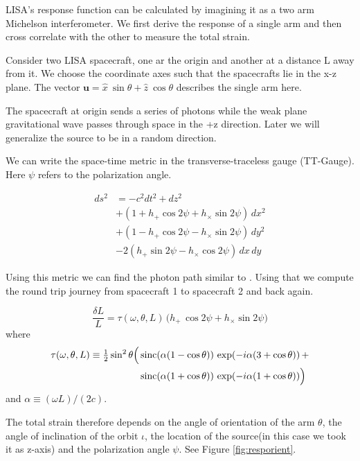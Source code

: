 \documentclass[10pt,a4paper]{article}
\def\sinc{\mathop{\rm sinc}\nolimits}
\begin{document}
LISA's response function can be calculated by imagining it as a two arm Michelson interferometer. We first derive the response of a single arm and then cross correlate with the other to measure the total strain.

Consider two LISA spacecraft, one ar the origin and another at a distance L away from it.  We choose the coordinate axes such that the spacecrafts lie in the x-z plane. The vector  $ \textbf{u} = \hat{x} \ \sin \theta + \hat{z} \ \cos \theta$ describes the single arm here.

The spacecraft at origin sends a series of photons while the weak plane gravitational wave passes through space in the +z direction. Later we will generalize the source to be in a random direction.

We can write the space-time metric in the transverse-traceless gauge
(TT-Gauge). Here $\psi$ refers to the polarization angle.

\begin{equation}
\begin{aligned}
ds^2 &= -c^2 dt^2 + dz^2 \\
&+ (1 + h_+\cos2\psi + h_\times\sin2\psi) \, dx^2 \\
&+ (1 - h_+\cos2\psi - h_\times\sin2\psi) \, dy^2 \\
&- 2(h_+\sin2\psi - h_\times\cos2\psi) \, dx\,dy
\end{aligned}
\end{equation}

Using this metric we can  find the photon path similar to
\cite{cornish}.
Using that we compute the round trip journey from spacecraft 1 to spacecraft 2 and back again.

\begin{equation}
  \frac{\delta L}L = \tau(\omega,\theta,L) \,
  \Big( h_+ \, \cos2\psi + h_\times \sin2\psi \Big)
\end{equation}
where
\begin{equation}
\begin{aligned}
  \tau(\omega,\theta,L) \equiv {\textstyle\frac12} \sin^2\theta
  \Big( &\sinc(\alpha(1-\cos\theta))\,\exp(-i\alpha(3+\cos\theta)) \, + \\
        &\sinc(\alpha(1+\cos\theta))\,\exp(-i\alpha(1+\cos\theta)) \Big)
\end{aligned}  
\end{equation}
and $\alpha\equiv(\omega L)/(2c)$.

The total strain therefore depends on the angle of orientation of the
arm $\theta$, the angle of inclination of the orbit $\iota$, the
location of the source(in this case we took it as z-axis) and the
polarization angle $\psi$.  See Figure \ref{fig:resporient}.
\end{document}
